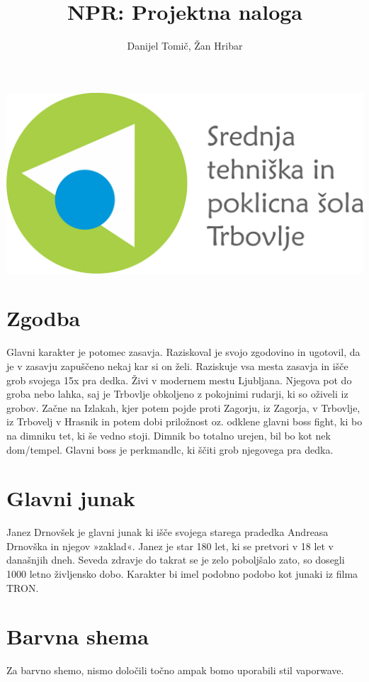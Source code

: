 \documentclass[a4paper]{article}
\author{Danijel Tomič, Žan Hribar}
\title{NPR: Projektna naloga}
\begin{document}
\maketitle

\begin{center}
\includegraphics[scale=0.5]{Logotip-z-napisom.png}
\end{center}
\newpage


\section{Zgodba}
Glavni karakter je potomec zasavja. Raziskoval je svojo zgodovino in ugotovil, da je v zasavju zapuščeno nekaj kar si on želi. Raziskuje vsa mesta zasavja in išče grob svojega 15x pra dedka. Živi v modernem mestu Ljubljana. Njegova pot do groba nebo lahka, saj je Trbovlje obkoljeno z pokojnimi rudarji, ki so oživeli iz grobov. Začne na Izlakah, kjer potem pojde proti Zagorju, iz Zagorja, v Trbovlje, iz Trbovelj v Hrasnik in potem dobi priložnost oz. odklene glavni boss fight, ki bo na dimniku tet, ki še vedno stoji. Dimnik bo totalno urejen, bil bo kot nek dom/tempel. Glavni boss je perkmandlc, ki ščiti grob njegovega pra dedka.

\section{Glavni junak}
Janez Drnovšek je glavni junak ki išče svojega starega pradedka Andreasa Drnovška in njegov »zaklad«. Janez je star 180 let, ki se pretvori v 18 let v današnjih dneh. Seveda zdravje do takrat se je zelo poboljšalo zato, so dosegli 1000 letno življensko dobo. Karakter bi imel podobno podobo kot junaki iz filma TRON.

\section{Barvna shema}
Za barvno shemo, nismo določili točno ampak bomo uporabili stil vaporwave.
\end{document}
